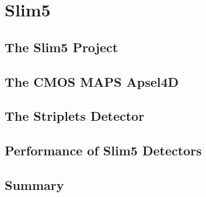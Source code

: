 \chapter{Slim5}

\section{The Slim5 Project}

\section{The CMOS MAPS Apsel4D}

\section{The Striplets Detector}

\section{Performance of Slim5 Detectors}

\section{Summary}